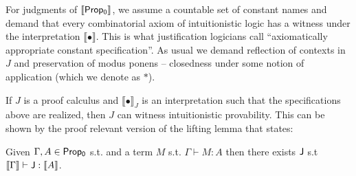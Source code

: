    For  judgments of ${\sf \llbracket Prop_0\rrbracket}$, we assume a countable set of constant names and demand that every combinatorial
    axiom of intuitionistic logic has  a witness under the interpretation 
    $\llbracket\bullet\rrbracket$. This is what justification logicians call ``axiomatically appropriate constant specification''.
    As usual we demand reflection of contexts in $J$
    and preservation of modus ponens -- closedness under some notion of application (which we denote as $*$).
    
    
    If  $J$ is a proof calculus and $\llbracket\bullet \rrbracket_J$ is  an interpretation such that the specifications above  
    are realized, then $J$ can witness intuitionistic provability. This can be shown by the proof relevant version of the lifting  lemma
    that states:
    \begin{lemma}
        \label{bracklift}
        Given  $\Gamma,  A \in {\sf Prop_0}$ s.t. and a term $M$ s.t. $\Gamma\vdash  M: A $ then there exists ${\sf J}$ s.t  $\llbracket \Gamma\rrbracket \vdash {\sf J}:\llbracket   A \rrbracket$. 
    \end{lemma}
    
